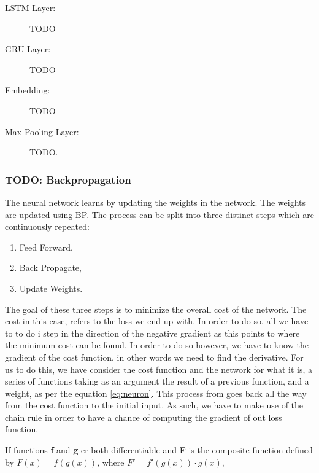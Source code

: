 \begin{description}

    \item[\gls{LSTM} Layer:] TODO
    \item[\gls{GRU} Layer:] TODO
    \item[Embedding:] TODO
    \item[Max Pooling Layer:] TODO.
\end{description}

\subsubsection{TODO: Backpropagation}\label{sec:BP}

The neural network learns by updating the weights in the network. The weights
are updated using \gls{BP}. The process can be split into three distinct steps
which are continuously repeated:

\begin{enumerate}
    \item Feed Forward,
    \item Back Propagate,
    \item Update Weights.
\end{enumerate}

The goal of these three steps is to minimize the overall cost of the network.
The cost in this case, refers to the loss we end up with. In order to do so,
all we have to to do i step in the direction of the negative gradient as this
points to where the minimum cost can be found. In order to do so however, we
have to know the gradient of the cost function, in other words we need to find
the derivative. For us to do this, we have consider the cost function and the
network for what it is, a series of functions taking as an argument the result
of a previous function, and a weight, as per the equation \ref{eq:neuron}. This
process from goes back all the way from the cost function to the initial input.
As such, we have to make use of the chain rule in order to have a chance of
computing the gradient of out loss function.

\begin{definition}

    If functions \textbf{f} and \textbf{g} er both differentiable and
    \textbf{F} is the composite function defined by $F(x) = f(g(x))$,
    where $F' = f'(g(x)) \cdot g(x)$,

\end{definition}

